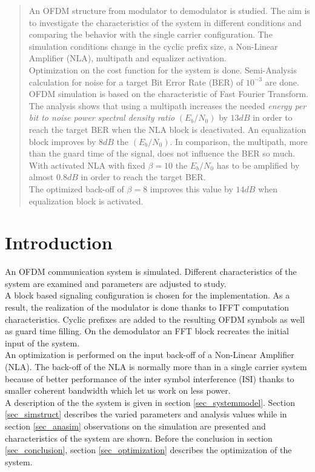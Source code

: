 \begin{abstract}
An OFDM structure from modulator to demodulator is studied. The aim is to investigate the characteristics of the system in different conditions and comparing the behavior with the single carrier configuration. The simulation conditions change in the cyclic prefix size, a Non-Linear Amplifier (NLA), multipath and equalizer activation. \\ Optimization on the cost function for the system is done. Semi-Analysis calculation for noise for a target Bit Error Rate (BER) of $10^{-3}$ are done. OFDM simulation is based on the characteristic of Fast Fourier Transform.\\
The analysis shows that using a multipath increases the needed \textit{energy per bit to noise power spectral density ratio} $(E_{b}/N_{0})$ by $13dB$ in order to reach the target BER when the NLA block is deactivated. An equalization block improves by $8dB$ the $(E_{b}/N_{0})$. In comparison, the multipath, more than the guard time of the signal, does not influence the BER so much.\\ With activated NLA with fixed $\beta=10$ the $E_{b}/N_{0}$ has to be amplified by almost $0.8dB$ in order to reach the target BER. \\ The optimized back-off of $\beta=8$ improves this value by $14dB$ when equalization block is activated.
 
\end{abstract}

\section{Introduction}
An OFDM communication system is simulated. Different characteristics of the system are examined and parameters are adjusted to study.\\ A block based signaling configuration is chosen for the implementation. As a result, the realization of the modulator is done thanks to IFFT computation characteristics. Cyclic prefixes are added to the resulting OFDM symbols as well as guard time filling. On the demodulator an FFT block recreates the initial input of the system. \\
An optimization is performed on the input back-off of a Non-Linear Amplifier (NLA). The back-off of the NLA is normally more than in a single carrier system because of better performance of the inter symbol interference (ISI) thanks to smaller coherent bandwidth which let us work on less power. \\
A description of the the system is given in section \ref{sec_systemmodel}. Section \ref{sec_simstruct} describes the varied parameters and analysis values while in section \ref{sec_anasim} observations on the simulation are presented and characteristics of the system are shown. Before the conclusion in section \ref{sec_conclusion}, section \ref{sec_optimization} describes the optimization of the system.


